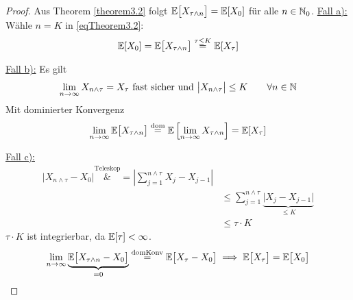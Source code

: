 \begin{proof}
	Aus Theorem \ref{theorem3.2} folgt $\mathbb{E}\big[X_{\tau\wedge n}\big]=\mathbb{E}[X_0]$ für alle $n\in\mathbb{N}_0$.\nl
	\underline{Fall a):}\\
	Wähle $n=K$ in \eqref{eqTheorem3.2}:
	\begin{align*}
		\mathbb{E}[X_0]=\mathbb{E}\big[X_{\tau\wedge n}\big]\stackrel{\tau\leq K}{=}\mathbb{E}[X_\tau]
	\end{align*}

	\underline{Fall b):} Es gilt
	\begin{align*}
		\lim\limits_{n\to\infty} X_{n\wedge\tau}=X_\tau\text{ fast sicher und }\big| X_{n\wedge\tau}\big|\leq K\qquad\forall n\in\mathbb{N}
	\end{align*}
	Mit dominierter Konvergenz
	\begin{align*}
		\lim\limits_{n\to\infty}\mathbb{E}\big[X_{\tau\wedge n}\big]\stackrel{\text{dom}}{=}\mathbb{E}\left[\lim\limits_{n\to\infty} X_{\tau\wedge n}\right]=\mathbb{E}[X_\tau]
	\end{align*}

	\underline{Fall c):}
	\begin{align*}
		\big| X_{n\wedge\tau}-X_0\big|
		\overset{\text{Teleskop}}&=
		\left|\sum\limits_{j=1}^{n\wedge\tau} X_j-X_{j-1}\right|\\
		&\leq\sum\limits_{j=1}^{n\wedge\tau} \underbrace{\big|X_j-X_{j-1}\big|}_{\leq K}\\
		&\leq\tau\cdot K
	\end{align*}
	$\tau\cdot K$ ist integrierbar, da $\mathbb{E}[\tau]<\infty$.
	\begin{align*}
		\lim\limits_{n\to\infty}\underbrace{\mathbb{E}\big[X_{\tau\wedge n}-X_0\big]}_{=0}\stackrel{\text{domKonv}}{=}\mathbb{E}\big[X_\tau-X_0\big]
		\implies
		\mathbb{E}\big[X_\tau\big]=\mathbb{E}\big[X_0\big]
	\end{align*}
\end{proof}

